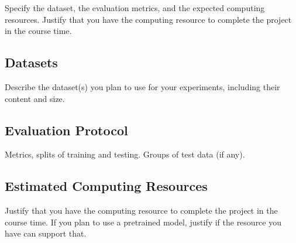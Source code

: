 \documentclass[11pt]{article}
\begin{document}
Specify the dataset, the evaluation metrics, and the expected computing resources. Justify that you have the computing resource to complete the project in the course time.

\subsection{Datasets}

Describe the dataset(s) you plan to use for your experiments, including their content and size.

\subsection{Evaluation Protocol}

Metrics, splits of training and testing. Groups of test data (if any).

\subsection{Estimated Computing Resources}

Justify that you have the computing resource to complete the project in the course time. If you plan to use a pretrained model, justify if the resource you have can support that.








\end{document}
